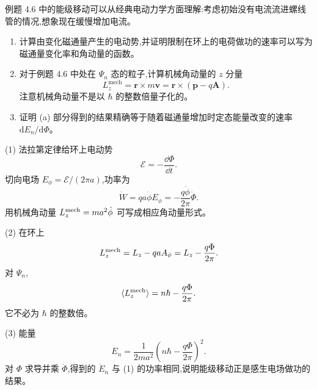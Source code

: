 \begin{question}
例题 4.6 中的能级移动可以从经典电动力学方面理解:考虑初始没有电流流进螺线管的情况,想象现在缓慢增加电流。
\begin{enumerate}
\item 计算由变化磁通量产生的电动势,并证明限制在环上的电荷做功的速率可以写为磁通量变化率和角动量的函数。
\item 对于例题 4.6 中处在 $\Psi_n$ 态的粒子,计算机械角动量的 $z$ 分量
\[
L_z^{\mathrm{mech}}=\mathbf r\times m\mathbf v=\mathbf r\times(\mathbf p-q\mathbf A).
\]
注意机械角动量不是以 $\hbar$ 的整数倍量子化的。
\item 证明 (a) 部分得到的结果精确等于随着磁通量增加时定态能量改变的速率 $\mathrm dE_n/\mathrm d\Phi$。
\end{enumerate}
\begin{solution}

(1) 法拉第定律给环上电动势
\[
\mathcal E=-\frac{\dd\Phi}{\dd t}.
\]
切向电场 $E_\phi=\mathcal E/(2\pi a)$,功率为
\[
\dot W=q a\dot\phi E_\phi=-\frac{q\dot\phi}{2\pi}\dot\Phi.
\]
用机械角动量 $L_z^{\rm mech}=ma^2\dot\phi$ 可写成相应角动量形式。

(2) 在环上
\[
L_z^{\rm mech}=L_z-q a A_\phi=L_z-\frac{q\Phi}{2\pi}.
\]
对 $\Psi_n$,
\[
\langle L_z^{\rm mech}\rangle=n\hbar-\frac{q\Phi}{2\pi}.
\]
它不必为 $\hbar$ 的整数倍。

(3) 能量
\[
E_n=\frac{1}{2ma^2}\left(n\hbar-\frac{q\Phi}{2\pi}\right)^2.
\]
对 $\Phi$ 求导并乘 $\dot\Phi$,得到的 $\dot E_n$ 与 (1) 的功率相同,说明能级移动正是感生电场做功的结果。

\end{solution}
\end{question}
